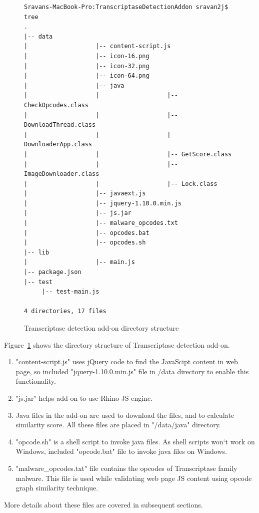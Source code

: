 \begin{figure}[h]
  \centering
\begin{lstlisting}[style=BashInputStyle,numbers=none,mathescape=false,tabsize=4,keywords=none]
Sravans-MacBook-Pro:TranscriptaseDetectionAddon sravan2j$ tree
.
|-- data
|  	  	  	  	   	|-- content-script.js
|  	  	  	  	   	|-- icon-16.png
|  	  	  	   	   	|-- icon-32.png
|  	  	  	  	   	|-- icon-64.png
|  	  	  	  	   	|-- java
|  	  	  	  	   	|  	  	  	  	   	|-- CheckOpcodes.class
|  	  	  	  	   	|  	  	  	  	   	|-- DownloadThread.class
|  	  	  	  	   	|  	  	  	  	   	|-- DownloaderApp.class
|  	  	  	  	   	|  	  	  	  	   	|-- GetScore.class
|  	  	  	  	   	|  	  	  	  	   	|-- ImageDownloader.class
|  	  	  	  	   	|  	  	  	  	   	|-- Lock.class
|  	  	  	  	   	|-- javaext.js
|  	  	  	  	   	|-- jquery-1.10.0.min.js
|  	  	  	  	   	|-- js.jar
|  	  	  	  	   	|-- malware_opcodes.txt
|  	  	  	  	   	|-- opcodes.bat
|  	  	  	  	   	|-- opcodes.sh
|-- lib
|  	  	  	  	   	|-- main.js
|-- package.json
|-- test
  	 |-- test-main.js
	
4 directories, 17 files
\end{lstlisting}
    \caption[Transcriptase detection add-on directory structure]{Transcriptase detection add-on directory structure}
    \label{fig:transdetectaddon}
\end{figure}
Figure~\ref{fig:transdetectaddon} shows the directory structure of Transcriptase detection add-on. 
\begin{enumerate}
\item "content-script.js" uses jQuery code to find the JavaScipt content in web page, so included "jquery-1.10.0.min.js" file in /data directory to enable this functionality. 
\item "js.jar" helps add-on to use Rhino JS engine.
\item Java files in the add-on are used to download the files, and to calculate similarity score. All these files are placed in "/data/java" directory.
\item "opcode.sh" is a shell script to invoke java files. As shell scripts won`t work on Windows, included "opcode.bat" file to invoke java files on Windows. 
\item "malware\_opcodes.txt" file contains the opcodes of Transcriptase family malware. This file is used while validating web page JS content using opcode graph similarity technique. 
\end{enumerate}
More details about these files are covered in subsequent sections.

